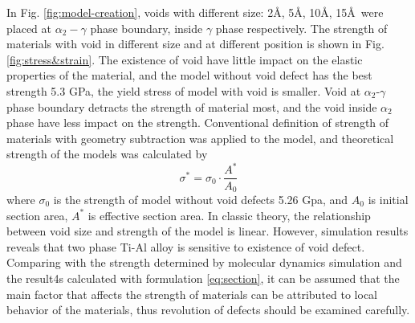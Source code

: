 \documentclass[metals,article,submit,moreauthors,pdftex,10pt,a4paper]{Definitions/mdpi}
\begin{document}
In Fig. \ref{fig:model-creation}, voids with different size: 2\AA, 5\AA, 10\AA, 15\AA\ were placed  at $\alpha_2-\gamma$ phase boundary, inside $\gamma$ phase respectively. The strength of materials with void in different size and at different position is shown in Fig.\ref{fig:stress&strain}. The existence of void have little impact on the elastic properties of the material, and the model without void defect has the best strength 5.3 GPa, the yield stress of model with void is smaller. Void at $\alpha_2$-$\gamma$ phase boundary  detracts the strength of  material most, and the void inside $\alpha_2$ phase  have less impact on the strength.          
Conventional definition of strength of materials with geometry subtraction was applied to the model, and theoretical strength of the models was calculated by
\begin{equation} \label{eq:section} 
\sigma^* = \sigma_0 \cdot \frac{A^*}{A_0}
\end{equation}
where $\sigma_0$ is the strength of model without void defects 5.26 Gpa, and $A_0$ is initial section area,  $A^*$ is effective section area.  In classic theory, the relationship between void size and strength of the model is linear. However, simulation results reveals that two phase Ti-Al alloy is sensitive to existence of void defect.  Comparing with the strength determined by molecular dynamics simulation and the result4s calculated with formulation \ref{eq:section}, it can be assumed that the main factor that affects the strength of materials can be attributed to local behavior of the materials, thus revolution of defects should be examined carefully.
\end{document}
